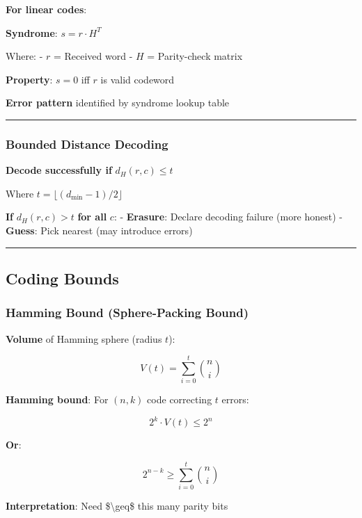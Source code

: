 \textbf{For linear codes}:

\textbf{Syndrome}: \(s = r \cdot H^T\)

Where: - \(r\) = Received word - \(H\) = Parity-check matrix

\textbf{Property}: \(s = 0\) iff \(r\) is valid codeword

\textbf{Error pattern} identified by syndrome lookup table

\begin{center}\rule{0.5\linewidth}{0.5pt}\end{center}

\subsubsection{Bounded Distance
Decoding}\label{bounded-distance-decoding}

\textbf{Decode successfully if} \(d_H(r, c) \leq t\)

Where \(t = \lfloor (d_{\min} - 1)/2 \rfloor\)

\textbf{If} \(d_H(r, c) > t\) \textbf{for all} \(c\): -
\textbf{Erasure}: Declare decoding failure (more honest) -
\textbf{Guess}: Pick nearest (may introduce errors)

\begin{center}\rule{0.5\linewidth}{0.5pt}\end{center}

\subsection{Coding Bounds}\label{coding-bounds}

\subsubsection{Hamming Bound (Sphere-Packing
Bound)}\label{hamming-bound-sphere-packing-bound}

\textbf{Volume} of Hamming sphere (radius \(t\)):

\[
V(t) = \sum_{i=0}^{t} \binom{n}{i}
\]

\textbf{Hamming bound}: For \((n, k)\) code correcting \(t\) errors:

\[
2^k \cdot V(t) \leq 2^n
\]

\textbf{Or}:

\[
2^{n-k} \geq \sum_{i=0}^{t} \binom{n}{i}
\]

\textbf{Interpretation}: Need \$\textbackslash geq\$ this many parity
bits

